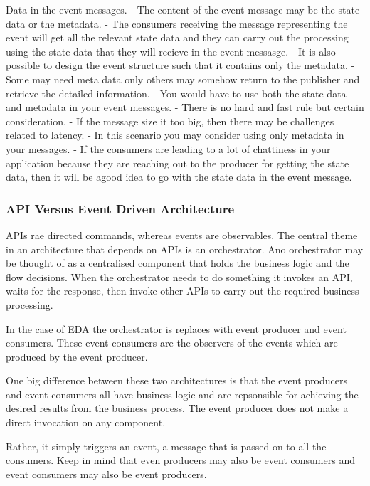 Data in the event messages.
- The content of the event message may be the state data or the metadata.
- The consumers receiving the message representing the event will get all the relevant state data and they can carry out the processing using the state data that they will recieve in the event messasge.
- It is also possible to design the event structure such that it contains only the metadata.
- Some may need meta data only others may somehow return to the publisher and retrieve the detailed information.
- You would have to use both the state data and metadata in your event messages.
- There is no hard and fast rule but certain consideration.
- If the message size it too big, then there may be challenges related to latency.
- In this scenario you may consider using only metadata in your messages.
- If the consumers are leading to a lot of chattiness in your application because they are reaching out to the producer for getting the state data, then it will be agood idea to go with the state data in the event message.

\subsubsection{API Versus Event Driven Architecture}
APIs rae directed commands, whereas events are observables.
The central theme in an architecture that depends on APIs is an orchestrator.
Ano orchestrator may be thought of as a centralised component that holds the business logic and the flow decisions.
When the orchestrator needs to do something it invokes an API, waits for the response, then invoke other APIs to carry out the required business processing.

In the case of EDA the orchestrator is replaces with event producer and event consumers.
These event consumers are the observers of the events which are produced by the event producer.

One big difference between these two architectures is that the event producers and event consumers all have business logic and are repsonsible for achieving the desired results from the business process.
The event producer does not make a direct invocation on any component.

Rather, it simply triggers an event, a message that is passed on to all the consumers.
Keep in mind that even producers may also be event consumers and event consumers may also be event producers.

